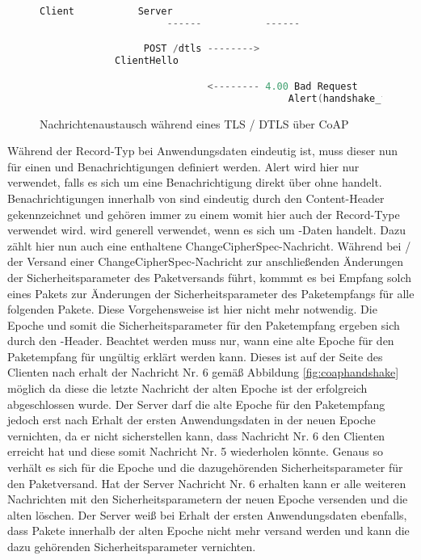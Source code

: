{\begin{figure}[ht]
  \centering
  \begin{lstlisting}[language=c]
                      Client           Server
                      ------           ------

                  POST /dtls -------->
             ClientHello

                             <-------- 4.00 Bad Request
                                           Alert(handshake_failure)
  \end{lstlisting}
  \caption{Nachrichtenaustausch während eines TLS / DTLS  über CoAP}
  \label{fig:coaphandshakefail}
\end{figure}

Während der Record-Typ bei Anwendungsdaten eindeutig ist, muss dieser nun für einen  und Benachrichtigungen definiert werden.
Alert wird hier nur verwendet, falls es sich um eine Benachrichtigung direkt über  ohne  handelt.
Benachrichtigungen innerhalb von  sind eindeutig durch den Content-Header gekennzeichnet und gehören immer zu einem 
womit hier auch der Record-Type  verwendet wird.  wird generell verwendet, wenn es sich um -Daten handelt.
Dazu zählt hier nun auch eine enthaltene ChangeCipherSpec-Nachricht. Während bei / der Versand einer ChangeCipherSpec-Nachricht
zur anschließenden Änderungen der Sicherheitsparameter des Paketversands führt, kommmt es bei Empfang solch eines Pakets zur Änderungen der
Sicherheitsparameter des Paketempfangs für alle folgenden Pakete. Diese Vorgehensweise ist hier nicht mehr notwendig. Die Epoche und somit
die Sicherheitsparameter für den Paketempfang ergeben sich durch den -Header. Beachtet werden muss nur, wann eine alte Epoche
für den Paketempfang für ungültig erklärt werden kann. Dieses ist auf der Seite des Clienten nach erhalt der Nachricht Nr. 6 gemäß Abbildung
\ref{fig:coaphandshake} möglich da diese die letzte Nachricht der alten Epoche ist der  erfolgreich abgeschlossen wurde.
Der Server darf die alte Epoche für den Paketempfang jedoch erst nach Erhalt der ersten Anwendungsdaten in der neuen Epoche vernichten, da
er nicht sicherstellen kann, dass Nachricht Nr. 6 den Clienten erreicht hat und diese somit Nachricht Nr. 5 wiederholen könnte.
Genaus so verhält es sich für die Epoche und die dazugehörenden Sicherheitsparameter für den Paketversand. Hat der Server Nachricht Nr. 6
erhalten kann er alle weiteren Nachrichten mit den Sicherheitsparametern der neuen Epoche versenden und die alten löschen. Der Server
weiß bei Erhalt der ersten Anwendungsdaten ebenfalls, dass Pakete innerhalb der alten Epoche nicht mehr versand werden und kann die
dazu gehörenden Sicherheitsparameter vernichten.

}
